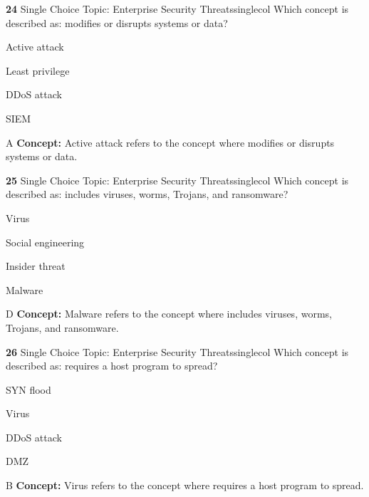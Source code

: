 \documentclass[10pt,a4paper]{article}
\begin{document}
\begin{qcard}{\color{white}\textbf{24} \hfill \small Single Choice \textbar{} Topic: Enterprise Security Threats}{singlecol}
Which concept is described as: modifies or disrupts systems or data?

\begin{qoptions}
\item Active attack
\item Least privilege
\item DDoS attack
\item SIEM
\end{qoptions}
\begin{explainbox}{A}
\textbf{Concept:} Active attack refers to the concept where modifies or disrupts systems or data.
\end{explainbox}
\end{qcard}

\begin{qcard}{\color{white}\textbf{25} \hfill \small Single Choice \textbar{} Topic: Enterprise Security Threats}{singlecol}
Which concept is described as: includes viruses, worms, Trojans, and ransomware?

\begin{qoptions}
\item Virus
\item Social engineering
\item Insider threat
\item Malware
\end{qoptions}
\begin{explainbox}{D}
\textbf{Concept:} Malware refers to the concept where includes viruses, worms, Trojans, and ransomware.
\end{explainbox}
\end{qcard}

\begin{qcard}{\color{white}\textbf{26} \hfill \small Single Choice \textbar{} Topic: Enterprise Security Threats}{singlecol}
Which concept is described as: requires a host program to spread?

\begin{qoptions}
\item SYN flood
\item Virus
\item DDoS attack
\item DMZ
\end{qoptions}
\begin{explainbox}{B}
\textbf{Concept:} Virus refers to the concept where requires a host program to spread.
\end{explainbox}
\end{qcard}
\end{document}
